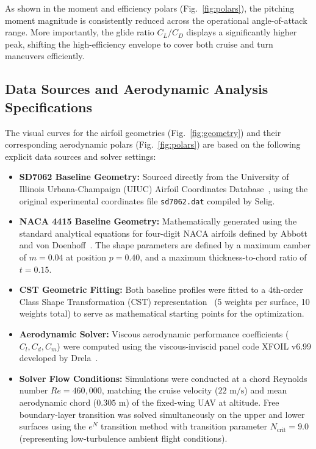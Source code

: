 \documentclass[11pt]{article}
\begin{document}
As shown in the moment and efficiency polars (Fig.~\ref{fig:polars}), the pitching moment magnitude is consistently reduced across the operational angle-of-attack range. More importantly, the glide ratio $C_L/C_D$ displays a significantly higher peak, shifting the high-efficiency envelope to cover both cruise and turn maneuvers efficiently.

\subsection{Data Sources and Aerodynamic Analysis Specifications}
\label{subsec:data_sources}
The visual curves for the airfoil geometries (Fig.~\ref{fig:geometry}) and their corresponding aerodynamic polars (Fig.~\ref{fig:polars}) are based on the following explicit data sources and solver settings:
\begin{itemize}
    \item \textbf{SD7062 Baseline Geometry:} Sourced directly from the University of Illinois Urbana-Champaign (UIUC) Airfoil Coordinates Database~\cite{selig1996}, using the original experimental coordinates file \texttt{sd7062.dat} compiled by Selig.
    \item \textbf{NACA 4415 Baseline Geometry:} Mathematically generated using the standard analytical equations for four-digit NACA airfoils defined by Abbott and von Doenhoff~\cite{abbott1959}. The shape parameters are defined by a maximum camber of $m=0.04$ at position $p=0.40$, and a maximum thickness-to-chord ratio of $t=0.15$.
    \item \textbf{CST Geometric Fitting:} Both baseline profiles were fitted to a 4th-order Class Shape Transformation (CST) representation~\cite{kulfan2008} (5 weights per surface, 10 weights total) to serve as mathematical starting points for the optimization.
    \item \textbf{Aerodynamic Solver:} Viscous aerodynamic performance coefficients ($C_l, C_d, C_m$) were computed using the viscous-inviscid panel code XFOIL v6.99 developed by Drela~\cite{drela1989}.
    \item \textbf{Solver Flow Conditions:} Simulations were conducted at a chord Reynolds number $Re = 460,000$, matching the cruise velocity ($22\text{ m/s}$) and mean aerodynamic chord ($0.305\text{ m}$) of the fixed-wing UAV at altitude. Free boundary-layer transition was solved simultaneously on the upper and lower surfaces using the $e^N$ transition method with transition parameter $N_{\text{crit}} = 9.0$ (representing low-turbulence ambient flight conditions).
\end{itemize}
\end{document}
